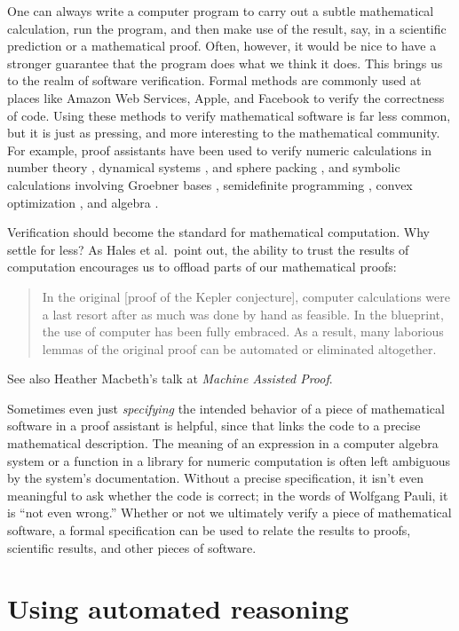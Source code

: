 \documentclass[12pt]{amsart}
\theoremstyle{definition}
\theoremstyle{remark}
\numberwithin{equation}{section}
\begin{document}
One can always write a computer program to carry out a subtle mathematical calculation, run the program, and then make use of the result, say, in a scientific prediction or a mathematical proof. Often, however, it would be nice to have a stronger guarantee that the program does what we think it does. This brings us to the realm of software verification. Formal methods are commonly used at places like Amazon Web Services, Apple, and Facebook to verify the correctness of code. Using these methods to verify mathematical software is far less common, but it is just as pressing, and more interesting to the mathematical community. For example, proof assistants have been used to verify numeric calculations in number theory \cite{mahboubi:et:al:19}, dynamical systems \cite{immler:18}, and sphere packing \cite{hales:et:al:17}, and symbolic calculations involving Groebner bases \cite{pottier:08}, semidefinite programming \cite{harrison:07}, convex optimization \cite{bentkamp:mir:avigad:23}, and algebra \cite{mahboubi:sibut:pinote:21}.

Verification should become the standard for mathematical computation. Why settle for less? As Hales et al.~point out, the ability to trust the results of computation encourages us to offload parts of our mathematical proofs:
\begin{quote}
In the original [proof of the Kepler conjecture], computer calculations were a last resort after as much was
done by hand as feasible. In the blueprint, the use of computer has been
fully embraced. As a result, many laborious lemmas of the original proof
can be automated or eliminated altogether. \cite[Section 4.3]{hales:et:al:17}
\end{quote}
See also Heather Macbeth's talk at \emph{Machine Assisted Proof}.

Sometimes even just \emph{specifying} the intended behavior of a piece of mathematical software in a proof assistant is helpful, since that links the code to a precise mathematical description. The meaning of an expression in a computer algebra system or a function in a library for numeric computation is often left ambiguous by the system's documentation. Without a precise specification, it isn't even meaningful to ask whether the code is correct; in the words of Wolfgang Pauli, it is ``not even wrong.'' Whether or not we ultimately verify a piece of mathematical software, a formal specification can be used to relate the results to proofs, scientific results, and other pieces of software.


\section{Using automated reasoning}
\label{section:enabling:automated:reasoning}
\end{document}
